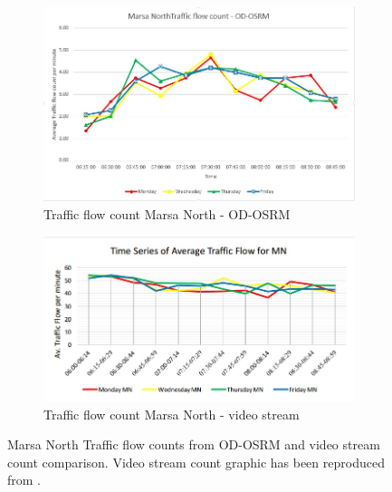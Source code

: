 \documentclass[12pt, a4paper]{report}
\theoremstyle{definition}
\theoremstyle{definition}%
\theoremstyle{definition}%
\theoremstyle{definition}%
\theoremstyle{definition}%
\theoremstyle{definition}%
\begin{document}
\begin{figure}[!] 
	\centering
	\begin{subfigure}{0.8\textwidth}
		\centering
		\includegraphics[width=\linewidth]{traffic_flow_count_MN_MINE.jpg} 
		\caption{\scriptsize{Traffic flow count Marsa North - OD-OSRM}} 
		\label{fig:traffic_flow_count_MN_MINE}
	\end{subfigure}
	
	\vspace{1cm}
	\begin{subfigure}{0.8\textwidth}
		\centering
		\includegraphics[width=\linewidth]{traffic_flow_count_MN_Nigel_pace.jpg} 
		\caption{\scriptsize{Traffic flow count Marsa North - video stream}}
		\label{fig:traffic_flow_count_MN_NP}
	\end{subfigure}
	\caption[Linear chart for Kappara northbound and southbound traffic flow]{Marsa North Traffic flow counts from OD-OSRM and video stream count comparison. Video stream count graphic has been reproduced from \cite{Pace2017}.}
	\label{fig:marsa_north_traffic_flow_line_chart}
\end{figure}
\end{document}
